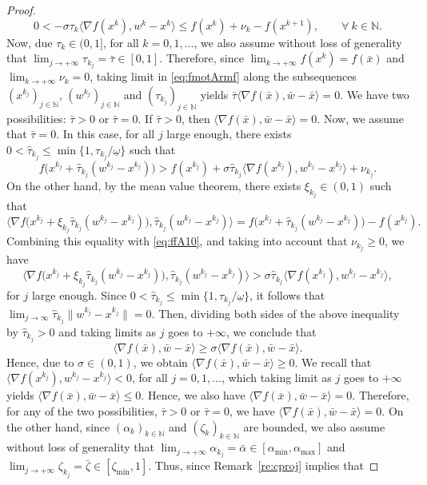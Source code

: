 \begin{proof}
	\begin{equation}\label{eq:fmotArmf}
		0 < -\sigma\tau_{k} \big\langle \nabla f(x^{k}), w^{k}-x^{k} \big\rangle \leq f(x^{k}) +\nu_k- f(x^{k+1}), \qquad \forall ~k \in \mathbb{N}.
	\end{equation}
	Now, due $\tau_k \in (0,1]$, for all $k=0,1, \ldots$, we also assume without loss of generality that $\lim_{j \to +\infty} \tau_{k_j} = \bar{\tau} \in [0,1].$
	Therefore,   since $\lim_{k\to +\infty} f(x^{k}) =f(\bar{x})$ and $\lim_{k\to +\infty} \nu_{k} = 0$, taking limit in \eqref{eq:fmotArmf} along the  subsequences  $(x^{k_j})_{j\in\mathbb{N}}$,  $(w^{k_j})_{j\in\mathbb{N}}$ and $(\tau_{k_j})_{j\in\mathbb{N}}$  yields
	$
		\bar{\tau} \big\langle \nabla f(\bar{x}), \bar{w}- \bar{x} \big\rangle=0.
	$
	We have two possibilities: $\bar{\tau} > 0$ or $\bar{\tau} = 0$. If $\bar{\tau} > 0$, then  $\big\langle \nabla f(\bar{x}), \bar{w}- \bar{x} \big\rangle = 0.$
	Now, we  assume that $\bar{\tau} = 0$. In this case, for all $j$ large enough, there exists $0<\hat\tau_{k_j}\leq \min\{1,\tau_{k_j}/\underline\omega\}$ such that
	\begin{equation}\label{eq:ffA10}
		f\big(x^{k_j}+\hat\tau_{k_j} (w^{k_j} - x^{k_j})\big) > f(x^{k_j}) + \sigma \hat\tau_{k_j} \big\langle \nabla f(x^{k_j}), w^{k_j} - x^{k_j} \big\rangle +\nu_{k_j}.
	\end{equation}
	On the other hand, by the mean value theorem, there exists $\xi_{k_j}\in(0,1)$ such that
	$$\langle \nabla f\big(x^{k_j}+\xi_{k_j}\hat\tau_{k_j} (w^{k_j} - x^{k_j})\big), \hat\tau_{k_j} (w^{k_j} - x^{k_j})\rangle = f\big(x^{k_j}+\hat\tau_{k_j} (w^{k_j} - x^{k_j})\big) - f(x^{k_j}).$$
	Combining this equality with \eqref{eq:ffA10}, and taking into account that $\nu_{k_j}\geq 0$, we have
	$$\langle \nabla f\big(x^{k_j}+\xi_{k_j}\hat\tau_{k_j} (w^{k_j} - x^{k_j})\big), \hat\tau_{k_j} (w^{k_j} - x^{k_j})\rangle>\sigma \hat\tau_{k_j} \big\langle \nabla f(x^{k_j}), w^{k_j} - x^{k_j} \big\rangle,$$
	for $j$ large enough. Since $0<\hat\tau_{k_j}\leq \min\{1,\tau_{k_j}/\underline\omega\}$, it follows that $\lim_{j\to\infty} \hat\tau_{k_j} \|w^{k_j} - x^{k_j}\|=0$. Then, dividing both sides of the above inequality by $\hat\tau_{k_j}>0$ and taking limits as $j$ goes to $+\infty$, we conclude that
	$$ \langle \nabla f(\bar{x}), \bar{w}-\bar{x} \rangle \geq \sigma \langle \nabla f(\bar{x}), \bar{w}-\bar{x} \rangle.$$
	Hence, due to $\sigma \in (0, 1)$, we obtain $\langle \nabla f(\bar{x}), \bar{w}-\bar{x} \rangle \geq 0$. We recall that $\langle \nabla f(x^{k_j}), w^{k_j}- x^{k_j} \rangle < 0$, for all $j=0, 1, \ldots$, which taking limit as $j$ goes to $+\infty$ yields $\langle \nabla f(\bar{x}), \bar{w}-\bar{x} \rangle \leq 0.$ Hence, we also have $\langle \nabla f(\bar{x}), \bar{w}-\bar{x} \rangle = 0$. Therefore, for any of the two possibilities, $\bar{\tau} > 0$ or $\bar{\tau} = 0$, we have $\langle \nabla f(\bar{x}), \bar{w}-\bar{x} \rangle = 0$. On the other hand,  since  $(\alpha_k)_{k\in\mathbb{N}}$ and    $(\zeta_k)_{k\in\mathbb{N}}$   are  bounded, we also assume without loss of generality that $\lim_{j \to +\infty} \alpha_{k_j} = \bar{\alpha} \in [\alpha_{\min}, \alpha_{\max}]$ and $\lim_{j \to +\infty} \zeta_{k_j} = {\bar \zeta} \in [\zeta_{\min}, 1]$. Thus, since Remark~\ref{re:cproj} implies that

\end{proof}
